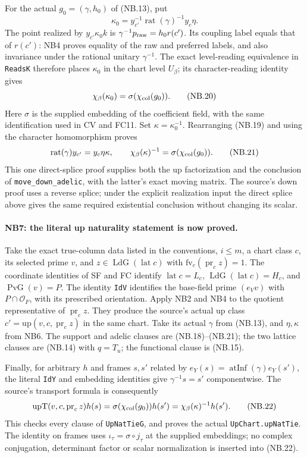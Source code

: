 \documentclass[11pt,a4paper]{article}
\numberwithin{equation}{section}
\theoremstyle{remark}\newtheorem{remark}[theorem]{Remark}
\begin{document}
For the actual $g_0=(\gamma,h_0)$ of (NB.13), put
\[
 \kappa_0=y_{c'}^{-1}\operatorname{rat}(\gamma)^{-1}y_c\eta.
                                                               \tag{NB.19}
\]
The point realized by $y_{c'}\kappa_0k$ is
$\gamma^{-1}p_{\rm raw}=h_0r(c')$. Its coupling label equals that
of $r(c')$: NB4 proves equality of the raw and preferred labels,
and also invariance under the rational unitary $\gamma^{-1}$.
The exact level-reading equivalence in \texttt{ReadsK} therefore
places $\kappa_0$ in the chart level $U_\beta$; its character-reading
identity gives
\[
 \chi_\beta(\kappa_0)=\sigma(\chi_{\rm col}(g_0)).  \tag{NB.20}
\]
Here $\sigma$ is the supplied embedding of the coefficient field,
with the same identification used in CV and FC11. Set
$\kappa=\kappa_0^{-1}$. Rearranging (NB.19) and using the character
homomorphism proves
\[
 \operatorname{rat}(\gamma)y_{c'}=y_c\eta\kappa,
 \qquad \chi_\beta(\kappa)^{-1}
                   =\sigma(\chi_{\rm col}(g_0)).     \tag{NB.21}
\]
This one direct-splice proof supplies both the up factorization and
the conclusion of \texttt{move\_\allowbreak down\_\allowbreak adelic}, with the latter's
exact moving matrix. The source's down proof uses a reverse splice;
under the explicit realization input the direct splice above gives
the same required existential conclusion without changing its scalar.

\paragraph{NB7: the literal up naturality statement is now proved.}
Take the exact true-column data listed in the conventions, $i\le m$,
a chart class $c$, its selected prime $v$, and
$z\in\operatorname{LdG}(\operatorname{lat}c)$ with
$\mathrm{fv}_c(\operatorname{pr}_c z)=1$.
The coordinate identities of SF and FC identify
$\operatorname{lat}c=L_c$, $\operatorname{LdG}(\operatorname{lat}c)=H_c$,
and $\operatorname{PvG}(v)=P$. The identity \texttt{IdV} identifies
the base-field prime $(e_Vv)$ with $P\cap\mathcal O_F$, with its prescribed
orientation. Apply NB2 and NB4 to the quotient representative of
$\operatorname{pr}_c z$. They produce the source's actual up class
$c'=\mathrm{up}(v,c,\operatorname{pr}_c z)$ in the same chart.
Take its actual $\gamma$ from (NB.13), and $\eta,\kappa$ from NB6.
The support and adelic clauses are (NB.18)--(NB.21); the two lattice
clauses are (NB.14) with $q=T_u$; the functional clause is (NB.15).

Finally, for arbitrary $h$ and frames $s,s'$ related by
$e_Y(s)=\operatorname{atInf}(\gamma)e_Y(s')$, the literal
\texttt{IdY} and embedding identities give $\gamma^{-1}s=s'$
componentwise. The source's transport formula is consequently
\[
 \mathrm{upT}(v,c,\operatorname{pr}_c z)h(s)
       =\sigma(\chi_{\rm col}(g_0))h(s')
       =\chi_\beta(\kappa)^{-1}h(s').                \tag{NB.22}
\]
This checks every clause of \texttt{UpNatTieG}, and proves the actual
\texttt{UpChart.upNatTie}. The identity on frames uses
$\iota_\tau=\sigma\circ j_\tau$ at the supplied embeddings; no
complex conjugation, determinant factor or scalar normalization is
inserted into (NB.22).
\end{document}
